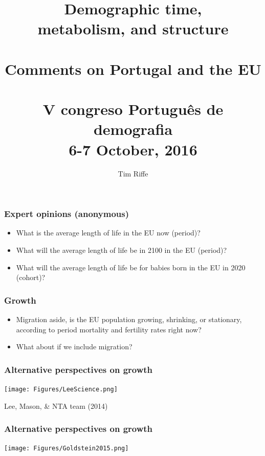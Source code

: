 \documentclass[20pt]{beamer}
\title{Demographic time, \\metabolism, and structure\\ \\\large{Comments on
Portugal and the EU}\\ \\
\small{V congreso Portugu\^{e}s de demografia} \\
\small{6-7 October, 2016}}
\subtitle{Tim Riffe}		%
\begin{document}

\begin{frame}
	\titlepage
\end{frame}


\begin{frame}
\frametitle{Expert opinions (anonymous)}
\begin{itemize}[<+->]
  \item What is the average length of life in the EU now (period)?
  \item What will the average length of life be in 2100 in the EU (period)?
  \item What will the average length of life be for babies born in the EU in
  2020 (cohort)?
\end{itemize}
\end{frame}


\begin{frame}
\frametitle{Growth}
\begin{itemize}[<+->]
   \item Migration aside, is the EU population growing, shrinking, or
stationary, according to period mortality and fertility rates right now?
   \item What about if we include migration?
\end{itemize}
\end{frame}


\begin{frame}
\frametitle{Alternative perspectives on growth}
\vspace{-2em}
\begin{center}
\texttt{[image: Figures/LeeScience.png]}
\end{center}
\vspace{-1.5em}
Lee, Mason, \& NTA team (2014)
\end{frame}


\begin{frame}
\frametitle{Alternative perspectives on growth}
\vspace{-2em}
\begin{center}
\texttt{[image: Figures/Goldstein2015.png]}
\end{center}
\end{frame}
\end{document}
